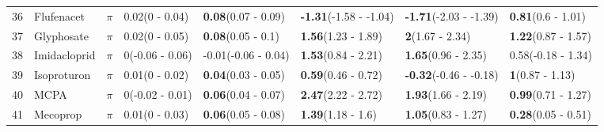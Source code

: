 \begin{longtable}{lp{2cm}p{0.7cm}p{2cm}p{2cm}p{2cm}p{2cm}p{2cm}}
  36 & Flufenacet & $\pi$ & 0.02\newline (0 - 0.04) & \textbf{0.08}\newline (0.07 - 0.09) & \textbf{-1.31}\newline (-1.58 - -1.04) & \textbf{-1.71}\newline (-2.03 - -1.39) & \textbf{0.81}\newline (0.6 - 1.01) \\ 
  37 & Glyphosate & $\pi$ & 0.02\newline (0 - 0.05) & \textbf{0.08}\newline (0.05 - 0.1) & \textbf{1.56}\newline (1.23 - 1.89) & \textbf{2}\newline (1.67 - 2.34) & \textbf{1.22}\newline (0.87 - 1.57) \\ 
  38 & Imidacloprid & $\pi$ & 0\newline (-0.06 - 0.06) & -0.01\newline (-0.06 - 0.04) & \textbf{1.53}\newline (0.84 - 2.21) & \textbf{1.65}\newline (0.96 - 2.35) & 0.58\newline (-0.18 - 1.34) \\ 
  39 & Isoproturon & $\pi$ & 0.01\newline (0 - 0.02) & \textbf{0.04}\newline (0.03 - 0.05) & \textbf{0.59}\newline (0.46 - 0.72) & \textbf{-0.32}\newline (-0.46 - -0.18) & \textbf{1}\newline (0.87 - 1.13) \\ 
  40 & MCPA & $\pi$ & 0\newline (-0.02 - 0.01) & \textbf{0.06}\newline (0.04 - 0.07) & \textbf{2.47}\newline (2.22 - 2.72) & \textbf{1.93}\newline (1.66 - 2.19) & \textbf{0.99}\newline (0.71 - 1.27) \\ 
  41 & Mecoprop & $\pi$ & 0.01\newline (0 - 0.03) & \textbf{0.06}\newline (0.05 - 0.08) & \textbf{1.39}\newline (1.18 - 1.6) & \textbf{1.05}\newline (0.83 - 1.27) & \textbf{0.28}\newline (0.05 - 0.51) \\ 

\end{longtable}
